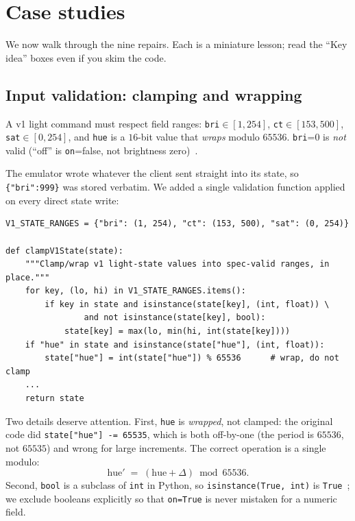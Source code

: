 \documentclass[11pt,a4paper]{article}
\newcommand{\code}[1]{\texttt{#1}}
\begin{document}
\section{Case studies}

We now walk through the nine repairs. Each is a miniature lesson; read the
``Key idea'' boxes even if you skim the code.

\subsection{Input validation: clamping and wrapping}

\begin{specbox}
A v1 light command must respect field ranges: \code{bri}$\in[1,254]$,
\code{ct}$\in[153,500]$, \code{sat}$\in[0,254]$, and \code{hue} is a $16$-bit
value that \emph{wraps} modulo $65536$. \code{bri}=$0$ is \emph{not} valid
(``off'' is \code{on}=\textsf{false}, not brightness zero)~\cite{huedev,openhue}.
\end{specbox}

The emulator wrote whatever the client sent straight into its state, so
\code{\{"bri":999\}} was stored verbatim. We added a single validation function
applied on every direct state write:

\begin{lstlisting}
V1_STATE_RANGES = {"bri": (1, 254), "ct": (153, 500), "sat": (0, 254)}

def clampV1State(state):
    """Clamp/wrap v1 light-state values into spec-valid ranges, in place."""
    for key, (lo, hi) in V1_STATE_RANGES.items():
        if key in state and isinstance(state[key], (int, float)) \
                and not isinstance(state[key], bool):
            state[key] = max(lo, min(hi, int(state[key])))
    if "hue" in state and isinstance(state["hue"], (int, float)):
        state["hue"] = int(state["hue"]) % 65536      # wrap, do not clamp
    ...
    return state
\end{lstlisting}

Two details deserve attention. First, \code{hue} is \emph{wrapped}, not clamped:
the original code did \code{state["hue"] -= 65535}, which is both off-by-one
(the period is $65536$, not $65535$) and wrong for large increments. The
correct operation is a single modulo:
\[
  \text{hue}' \;=\; (\text{hue} + \Delta) \bmod 65536 .
\]
Second, \code{bool} is a subclass of \code{int} in Python, so
\code{isinstance(True, int)} is \code{True}~\cite{pystdtypes}; we exclude booleans explicitly so
that \code{on=True} is never mistaken for a numeric field.
\end{document}
